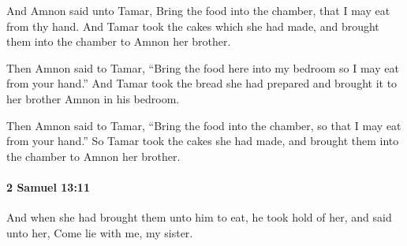 			\begin{versebox}
					\item[BHS] 
					\item[ASV] And Amnon said unto Tamar, Bring the food into the chamber, that I may eat from thy hand. And Tamar took the cakes which she had made, and brought them into the chamber to Amnon her brother.
					\item[NIV] Then Amnon said to Tamar, “Bring the food here into my bedroom so I may eat from your hand.” And Tamar took the bread she had prepared and brought it to her brother Amnon in his bedroom.
					\item[NRSV] Then Amnon said to Tamar, “Bring the food into the chamber, so that I may eat from your hand.” So Tamar took the cakes she had made, and brought them into the chamber to Amnon her brother.
			\end{versebox}

		\paragraph{2 Samuel 13:11} %
			\label{2SAMUEL-13-11}

			And when she had brought them unto him to eat, he took hold of her, and said unto her, Come lie with me, my sister.

